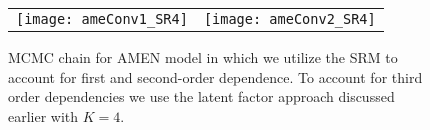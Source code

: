 \begin{figure}[ht]
	\centering
	\begin{tabular}{cc}
	\texttt{[image: ameConv1\_SR4]} &
	\texttt{[image: ameConv2\_SR4]}
	\end{tabular}
	\caption{MCMC chain for AMEN model in which we utilize the SRM to account for first and second-order dependence. To account for third order dependencies we use the latent factor approach discussed earlier with $K=4$.}
	\label{fig:ameConv}
\end{figure}
\FloatBarrier
\newpage
